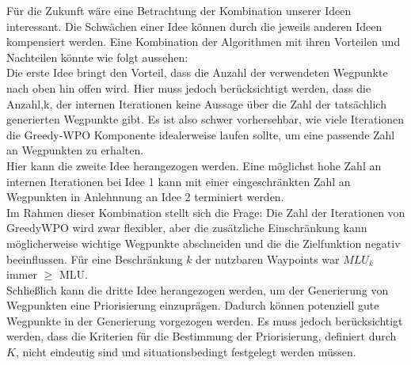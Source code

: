 \documentclass[sigconf,noacm,review]{acmart}
\begin{document}
Für die Zukunft wäre eine Betrachtung der Kombination unserer Ideen interessant. Die Schwächen einer Idee können durch die jeweils anderen Ideen kompensiert werden. Eine Kombination der Algorithmen mit ihren Vorteilen und Nachteilen könnte wie folgt aussehen:\\
Die erste Idee bringt den Vorteil, dass die Anzahl der verwendeten Wegpunkte nach oben hin offen wird. Hier muss jedoch berücksichtigt werden, dass die Anzahl,k, der internen Iterationen keine Aussage über die Zahl der tatsächlich generierten Wegpunkte gibt.  Es ist also schwer vorhersehbar, wie viele Iterationen die Greedy-WPO Komponente idealerweise laufen sollte, um eine passende Zahl an Wegpunkten zu erhalten. \\
Hier kann die zweite Idee herangezogen werden. Eine möglichst hohe Zahl an internen Iterationen bei Idee 1 kann mit einer eingeschränkten Zahl an Wegpunkten in Anlehnnung an Idee 2 terminiert werden.\\
Im Rahmen dieser Kombination stellt sich die Frage: Die Zahl der Iterationen von GreedyWPO wird zwar flexibler, aber die zusätzliche Einschränkung kann möglicherweise wichtige Wegpunkte abschneiden und die die Zielfunktion negativ beeinflussen. Für eine Beschränkung $k$ der nutzbaren Waypoints war $MLU_{k}$ immer $\geq$ MLU. \\

Schließlich kann die dritte Idee herangezogen werden, um der Generierung von Wegpunkten eine Priorisierung einzuprägen. Dadurch können potenziell gute Wegpunkte in der Generierung vorgezogen werden. Es muss jedoch berücksichtigt werden, dass die Kriterien für die Bestimmung der Priorisierung, definiert durch $K$, nicht eindeutig sind und situationsbedingt festgelegt werden müssen.
\end{document}
